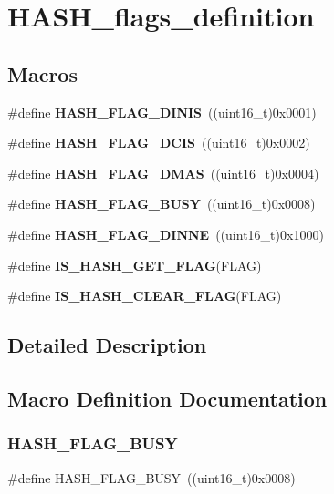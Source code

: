 \section{H\+A\+S\+H\+\_\+flags\+\_\+definition}
\label{group__HASH__flags__definition}
\subsection*{Macros}
\begin{DoxyCompactItemize}
\item 
\#define \textbf{ H\+A\+S\+H\+\_\+\+F\+L\+A\+G\+\_\+\+D\+I\+N\+IS}~((uint16\+\_\+t)0x0001)
\item 
\#define \textbf{ H\+A\+S\+H\+\_\+\+F\+L\+A\+G\+\_\+\+D\+C\+IS}~((uint16\+\_\+t)0x0002)
\item 
\#define \textbf{ H\+A\+S\+H\+\_\+\+F\+L\+A\+G\+\_\+\+D\+M\+AS}~((uint16\+\_\+t)0x0004)
\item 
\#define \textbf{ H\+A\+S\+H\+\_\+\+F\+L\+A\+G\+\_\+\+B\+U\+SY}~((uint16\+\_\+t)0x0008)
\item 
\#define \textbf{ H\+A\+S\+H\+\_\+\+F\+L\+A\+G\+\_\+\+D\+I\+N\+NE}~((uint16\+\_\+t)0x1000)
\item 
\#define \textbf{ I\+S\+\_\+\+H\+A\+S\+H\+\_\+\+G\+E\+T\+\_\+\+F\+L\+AG}(F\+L\+AG)
\item 
\#define \textbf{ I\+S\+\_\+\+H\+A\+S\+H\+\_\+\+C\+L\+E\+A\+R\+\_\+\+F\+L\+AG}(F\+L\+AG)
\end{DoxyCompactItemize}


\subsection{Detailed Description}


\subsection{Macro Definition Documentation}
\mbox{\label{group__HASH__flags__definition_ga7638e6048806f6ba361f162db23c2a53}} 
\subsubsection{H\+A\+S\+H\+\_\+\+F\+L\+A\+G\+\_\+\+B\+U\+SY}
{\footnotesize\ttfamily \#define H\+A\+S\+H\+\_\+\+F\+L\+A\+G\+\_\+\+B\+U\+SY~((uint16\+\_\+t)0x0008)}

